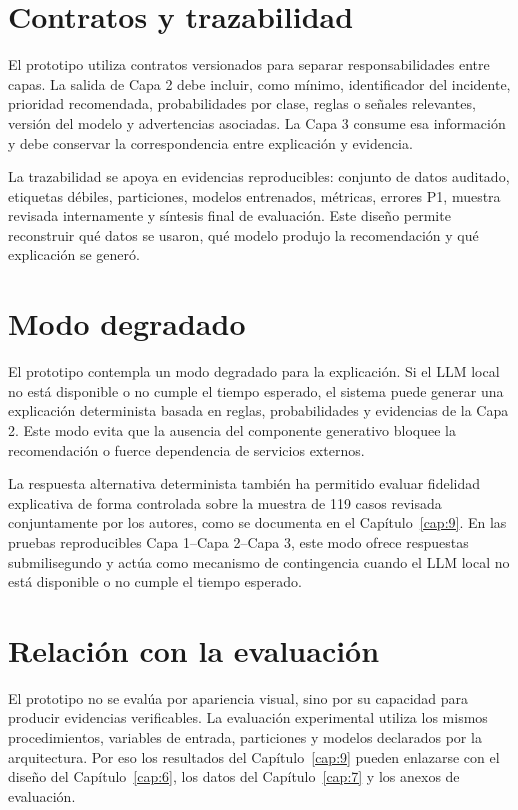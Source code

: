 \section{Contratos y trazabilidad}

El prototipo utiliza contratos versionados para separar responsabilidades entre capas. La salida de Capa 2 debe incluir, como mínimo, identificador del incidente, prioridad recomendada, probabilidades por clase, reglas o señales relevantes, versión del modelo y advertencias asociadas. La Capa 3 consume esa información y debe conservar la correspondencia entre explicación y evidencia.

La trazabilidad se apoya en evidencias reproducibles: conjunto de datos auditado, etiquetas débiles, particiones, modelos entrenados, métricas, errores P1, muestra revisada internamente y síntesis final de evaluación. Este diseño permite reconstruir qué datos se usaron, qué modelo produjo la recomendación y qué explicación se generó.

\section{Modo degradado}

El prototipo contempla un modo degradado para la explicación. Si el LLM local no está disponible o no cumple el tiempo esperado, el sistema puede generar una explicación determinista basada en reglas, probabilidades y evidencias de la Capa 2. Este modo evita que la ausencia del componente generativo bloquee la recomendación o fuerce dependencia de servicios externos.

La respuesta alternativa determinista también ha permitido evaluar fidelidad explicativa de forma controlada sobre la muestra de 119 casos revisada conjuntamente por los autores, como se documenta en el Capítulo~\ref{cap:9}. En las pruebas reproducibles Capa 1--Capa 2--Capa 3, este modo ofrece respuestas submilisegundo y actúa como mecanismo de contingencia cuando el LLM local no está disponible o no cumple el tiempo esperado.

\section{Relación con la evaluación}

El prototipo no se evalúa por apariencia visual, sino por su capacidad para producir evidencias verificables. La evaluación experimental utiliza los mismos procedimientos, variables de entrada, particiones y modelos declarados por la arquitectura. Por eso los resultados del Capítulo~\ref{cap:9} pueden enlazarse con el diseño del Capítulo~\ref{cap:6}, los datos del Capítulo~\ref{cap:7} y los anexos de evaluación.

